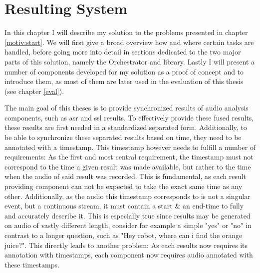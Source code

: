 \chapter{Resulting System}
\label{main:main}
In this chapter I will describe my solution to the problems presented in chapter \ref{motiv:start}.
We will first give a broad overview how and where certain tasks are handled, before going more into detail in sections dedicated to the two major parts of this solution, namely the Orchestrator and library.
Lastly I will present a number of components developed for my solution as a proof of concept and to introduce them, as most of them are later used in the evaluation of this thesis (see chapter \ref{eval}).

The main goal of this theses is to provide synchronized results of audio analysis components, such as \gls{asr} and \gls{ssl} results.
To effectively provide these fused results, these results are first needed in a standardized separated form.
Additionally, to be able to synchronize these separated results based on time, they need to be annotated with a timestamp.
This timestamp however needs to fulfill a number of requirements:
As the first and most central requirement, the timestamp must not correspond to the time a given result was made available, but rather to the time when the audio of said result was recorded.
This is fundamental, as each result providing component can not be expected to take the exact same time as any other.
Additionally, as the audio this timestamp corresponds to is not a singular event, but a continuous stream, it must contain a start \& an end-time to fully and accurately describe it.
This is especially true since results may be generated on audio of vastly different length, consider for example a simple "yes" or "no" in contrast to a longer question, such as "Hey robot, where can i find the orange juice?".
This directly leads to another problem:
As each results now requires its annotation with timestamps, each component now requires audio annotated with these timestamps.

